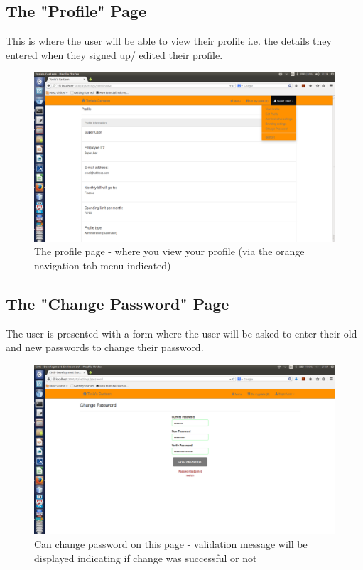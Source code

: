 \documentclass[a4paper,12pt]{report}
\begin{document}
\subsection{The "Profile" Page} 
This is where the user will be able to view their profile i.e. the details they entered when they signed up/ edited their profile. 

\begin{figure}[H]
  \centering
    \includegraphics[width=1.0\textwidth]{screenshots/viewProfile.png}
    \caption{The profile page - where you view your profile (via the orange navigation tab menu indicated)} 
\end{figure}

\subsection{The "Change Password" Page} 
The user is presented with a form where the user will be asked to enter their old and new passwords to change their password. 

\begin{figure}[H]
  \centering
    \includegraphics[width=1.0\textwidth]{screenshots/changePassDontMatch.png}
    \caption{Can change password on this page - validation message will be displayed indicating if change was successful or not} 
\end{figure}
\end{document}
